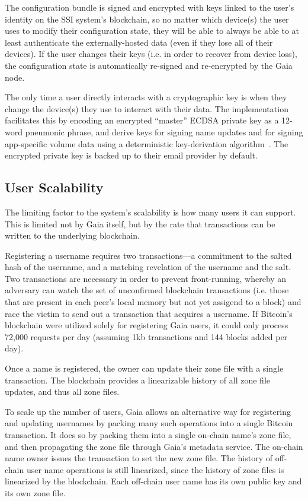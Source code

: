 The configuration bundle is signed and encrypted with keys linked to
the user's identity on the SSI system's blockchain, so no matter which device(s) the user
uses to modify their configuration state, they will be able to always be able to
at least authenticate the externally-hosted data (even if they lose all of their
devices).  If the user changes their keys (i.e. in order to recover from device
loss), the configuration state is
automatically re-signed and re-encrypted by the Gaia node.

The only time a user directly interacts with a cryptographic key is when they
change the device(s) they use to interact with their data.
The implementation facilitates this by
encoding an encrypted ``master'' ECDSA private key as a 12-word pneumonic phrase, and derive keys
for signing name updates and for signing app-specific volume data
using a deterministic key-derivation
algorithm~\cite{bip39}.  The encrypted private key is backed up to their email provider by
default.

\subsection{User Scalability}

The limiting factor to the system's scalability is how many users it can support.
This is limited not by Gaia itself, but by the rate that transactions can be
written to the underlying blockchain.

Registering a username requires two
transactions---a commitment to the salted hash of the username, and a matching
revelation of the username and the salt.  Two transactions are necessary in
order to prevent front-running, whereby an adversary can watch the set of
unconfirmed blockchain transactions (i.e. those that are present in each peer's
local memory but not yet assigend to a block) and race the victim to send out
a transaction that acquires a username.  If Bitcoin's blockchain were utilized
solely for registering Gaia users, it could only process 72,000 requests per day
(assuming 1kb transactions and 144 blocks added per day).

Once a name is registered, the owner can update their zone file with a single
transaction.  The blockchain provides a linearizable history of all zone file
updates, and thus all zone files.

To scale up the number of users, Gaia allows an alternative way for registering
and updating usernames by packing many such operations into a single Bitcoin
transaction.  It does so by packing them into a single on-chain name's zone
file, and then propagating the zone file through Gaia's metadata service.
The on-chain name owner issues the transaction to set the new zone file.
The history of off-chain user name operations is still linearized, since the history of
zone files is linearized by the blockchain.  Each off-chain user name has its
own public key and its own zone file.

